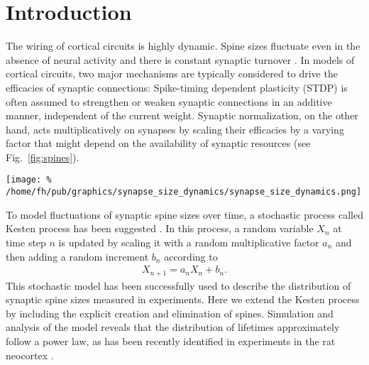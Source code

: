 \section{Introduction}
\vspace{-0.2cm}

The wiring of cortical circuits is highly dynamic. Spine sizes fluctuate even in the absence of neural activity and there is constant synaptic turnover \cite{Loewenstein2015}. In models of cortical circuits, two major mechanisms are typically considered to drive the efficacies of synaptic connections: Spike-timing dependent plasticity (STDP) is often assumed to strengthen or weaken synaptic connections in an additive manner, independent of the current weight. Synaptic normalization, on the other hand, acts multiplicatively on synapses by scaling their efficacies by a varying factor that might depend on the availability of synaptic resources \cite{Triesch2017} (see Fig.~\ref{fig:spines}).



\begin{center}\vspace{0.01cm}
  \texttt{[image: \%
    /home/fh/pub/graphics/synapse\_size\_dynamics/synapse\_size\_dynamics.png]} %
  \label{fig:spines}
\end{center}\vspace{2cm}


To model fluctuations of synaptic spine sizes over time, a stochastic process called Kesten process has been suggested \cite{Kesten1973, Statman2014}. In this process, a random variable $X_n$ at time step $n$ is updated by scaling it with a random multiplicative factor $a_n$ and then adding a random increment $b_n$ according to
%
\begin{align}
  X_{n+1} = a_n X_n + b_n. \label{eq:kesten}
\end{align}
%
This stochastic model has been successfully used to describe the distribution of synaptic spine sizes measured in experiments. Here we extend the Kesten process by including the explicit creation and elimination of spines. Simulation and analysis of the model reveals that the distribution of lifetimes approximately follow a power law, as has been recently identified in experiments in the rat neocortex \cite{Loewenstein2015}.


